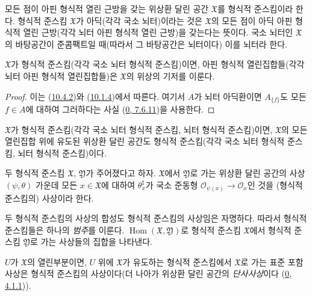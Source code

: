 \begin{definition}[10.4.2]
\label{I.10.4.2-ko}
모든 점이 아핀 형식적 열린 근방을 갖는 위상환 달린 공간
$\mathfrak{X}$를 형식적 준스킴이라 한다. 형식적 준스킴
$\mathfrak{X}$가 아딕(각각 국소 뇌터)이라는 것은 $\mathfrak{X}$의 모든
점이 아딕 아핀 형식적 열린 근방(각각 뇌터 아핀 형식적 열린 근방)을
갖는다는 뜻이다.
국소 뇌터인 $\mathfrak{X}$의 바탕공간이 준콤팩트일 때(따라서 그
바탕공간은 뇌터이다) 이를 뇌터라 한다.
\end{definition}

\begin{proposition}[10.4.3]
\label{I.10.4.3-ko}
$\mathfrak{X}$가 형식적 준스킴(각각 국소 뇌터 형식적 준스킴)이면,
아핀 형식적 열린집합들(각각 뇌터 아핀 형식적 열린집합들)은
$\mathfrak{X}$의 위상의 기저를 이룬다.
\end{proposition}

\begin{proof}
이는 (\hyperref[I.10.4.2-ko]{10.4.2})와
(\hyperref[I.10.1.4-ko]{10.1.4})에서 따른다. 여기서 $A$가 뇌터
아딕환이면 $A_{\{f\}}$도 모든 $f\in A$에 대하여 그러하다는 사실
(\hyperref[0.7.6.11-ko]{0, 7.6.11})을 사용한다.
\end{proof}

\begin{corollary}[10.4.4]
\label{I.10.4.4-ko}
$\mathfrak{X}$가 형식적 준스킴(각각 국소 뇌터 형식적 준스킴, 뇌터
형식적 준스킴)이면, $\mathfrak{X}$의 모든 열린집합 위에 유도된
위상환 달린 공간도 형식적 준스킴(각각 국소 뇌터 형식적 준스킴,
뇌터 형식적 준스킴)이다.
\end{corollary}

\begin{definition}[10.4.5]
\label{I.10.4.5-ko}
두 형식적 준스킴 $\mathfrak{X}$, $\mathfrak{Y}$가 주어졌다고 하자.
$\mathfrak{X}$에서 $\mathfrak{Y}$로 가는 위상환 달린 공간의 사상
$(\psi,\theta)$ 가운데 모든 $x\in\mathfrak{X}$에 대하여
$\theta_x^\sharp$가 국소 준동형
$\mathscr{O}_{\psi(x)}\to\mathscr{O}_x$인 것을 (형식적 준스킴의)
사상이라 한다.
\end{definition}

두 형식적 준스킴의 사상의 합성도 형식적 준스킴의 사상임은 자명하다.
따라서 형식적 준스킴들은 하나의 \emph{범주}를 이룬다.
$\operatorname{Hom}(\mathfrak{X},\mathfrak{Y})$로 형식적 준스킴
$\mathfrak{X}$에서 형식적 준스킴 $\mathfrak{Y}$로 가는 사상들의 집합을
나타낸다.

$U$가 $\mathfrak{X}$의 열린부분이면, $U$ 위에 $\mathfrak{X}$가 유도하는
형식적 준스킴에서 $\mathfrak{X}$로 가는 표준 포함 사상은 형식적
준스킴의 사상이다(더 나아가 위상환 달린 공간의 \emph{단사사상}이다
(\hyperref[0.4.1.1-ko]{0, 4.1.1})).


